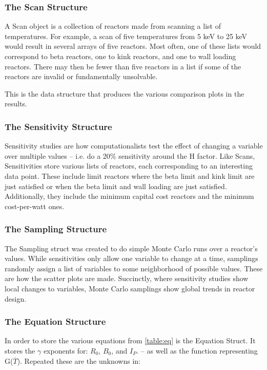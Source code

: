 \subsubsection{The Scan Structure}

A Scan object is a collection of reactors made from scanning a list of temperatures. For example, a scan of five temperatures from 5 keV to 25 keV would result in several arrays of five reactors. Most often, one of these lists would correspond to beta reactors, one to kink reactors, and one to wall loading reactors. There may then be fewer than five reactors in a list if some of the reactors are invalid or fundamentally unsolvable.

This is the data structure that produces the various comparison plots in the results.

\subsubsection{The Sensitivity Structure}

Sensitivity studies are how computationalists test the effect of changing a variable over multiple values -- i.e. do a 20\% sensitivity around the H factor. Like Scans, Sensitivities store various lists of reactors, each corresponding to an interesting data point. These include limit reactors where the beta limit and kink limit are just satisfied or when the beta limit and wall loading are just satisfied. Additionally, they include the minimum capital cost reactors and the minimum cost-per-watt ones. 

\subsubsection{The Sampling Structure}

The Sampling struct was created to do simple Monte Carlo runs over a reactor's  values. While sensitivities only allow one variable to change at a time, samplings randomly assign a list of variables to some neighborhood of possible values. These are how the scatter plots are made. Succinctly, where sensitivity studies show local changes to variables, Monte Carlo samplings show global trends in reactor design.

\subsubsection{The Equation Structure}

In order to store the various equations from \cref{table:eq} is the Equation Struct. It stores the $\gamma$ exponents for: $R_0$, $B_0$, and $I_P$. -- as well as the function representing G($\overline T$). Repeated these are the unknowns in:

